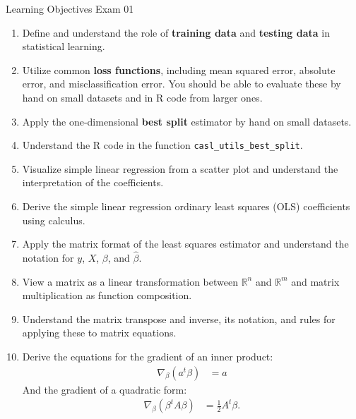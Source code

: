 \documentclass[11pt]{article}
\begin{document}
{\LARGE \textcolor{oiB}{Learning Objectives \hfill Exam 01}} \\

\begin{enumerate}
\renewcommand\labelenumi{\textcolor{light}{\textbf{LO \theenumi.}}}

\item Define and understand the role of \textbf{training data} and
\textbf{testing data} in statistical learning.

\item Utilize common \textbf{loss functions}, including mean squared error,
absolute error, and misclassification error. You should be able to evaluate
these by hand on small datasets and in R code from larger ones.

\item Apply the one-dimensional \textbf{best split} estimator by hand on small
datasets.

\item Understand the R code in the function \verb|casl_utils_best_split|.

\item Visualize simple linear regression from a scatter plot and understand
the interpretation of the coefficients.

\item Derive the simple linear regression ordinary least squares (OLS)
coefficients using calculus.

\item Apply the matrix format of the least squares estimator and understand
the notation for $y$, $X$, $\beta$, and $\widehat{\beta}$.

\item View a matrix as a linear transformation between $\mathbb{R}^n$ and
$\mathbb{R}^m$ and matrix multiplication as function composition.

\item Understand the matrix transpose and inverse, its notation, and rules
for applying these to matrix equations.

\item Derive the equations for the gradient of an inner product:
\begin{align*}
\nabla_\beta \left( a^t \beta \right) &= a
\end{align*}
And the gradient of a quadratic form:
\begin{align*}
\nabla_\beta \left( \beta^t A \beta \right) &= \frac{1}{2} A^t \beta.
\end{align*}


\end{enumerate}
\end{document}
